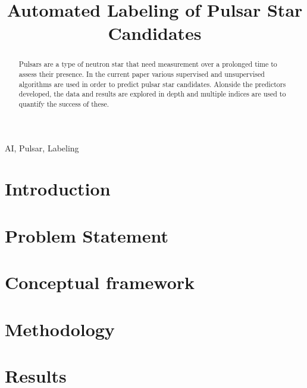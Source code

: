 \documentclass[journal]{IEEEtran}
\begin{document}
\title{Automated Labeling of Pulsar Star Candidates}

\author{
    }

\maketitle

\listoftodos

\begin{abstract}
    Pulsars are a type of neutron star that need measurement over a prolonged
    time to assess their presence. In the current paper various supervised and
    unsupervised algorithms are used in order to predict pulsar star candidates.
    Alonside the predictors developed, the data and results are explored in
    depth and multiple indices are used to quantify the success of these.
\end{abstract}

\begin{IEEEkeywords}
    AI, Pulsar, Labeling
\end{IEEEkeywords}

\section{Introduction\label{sec:intro}} 


\section{Problem Statement\label{sec:problem}}


\section{Conceptual framework}


\section{Methodology\label{sec:methods}}


\section{Results}


\printbibliography
\end{document}
